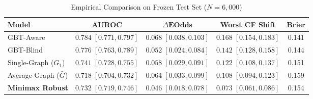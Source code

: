 \begin{table}[h]
\centering
\caption{Empirical Comparison on Frozen Test Set ($N=6,000$)}
\begin{tabular}{lcccc}
\toprule
\textbf{Model} & \textbf{AUROC} & $\Delta\textbf{EOdds}$ & \textbf{Worst CF Shift} & \textbf{Brier} \\
\midrule
GBT-Aware & $0.784 \; [0.771, 0.797]$ & $0.068 \; [0.038, 0.103]$ & $0.168 \; [0.154, 0.183]$ & 0.141 \\
GBT-Blind & $0.776 \; [0.763, 0.789]$ & $0.052 \; [0.024, 0.084]$ & $0.142 \; [0.128, 0.158]$ & 0.144 \\
Single-Graph ($G_1$) & $0.741 \; [0.728, 0.755]$ & $0.058 \; [0.029, 0.091]$ & $0.122 \; [0.108, 0.137]$ & 0.151 \\
Average-Graph ($\bar{G}$) & $0.718 \; [0.704, 0.732]$ & $0.064 \; [0.033, 0.099]$ & $0.108 \; [0.094, 0.123]$ & 0.159 \\
\textbf{Minimax Robust} & $\mathbf{0.732} \; [0.719, 0.746]$ & $\mathbf{0.046} \; [0.018, 0.078]$ & $\mathbf{0.073} \; [0.061, 0.086]$ & 0.154 \\
\bottomrule
\end{tabular}
\end{table}
